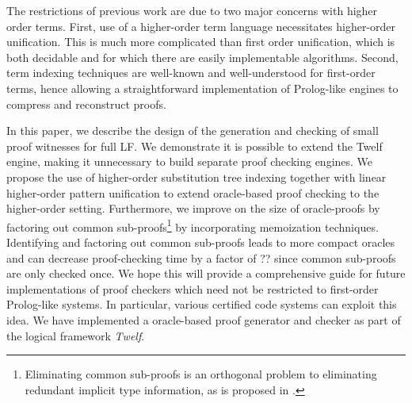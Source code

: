 \documentclass{acmconf}
\begin{document}
The restrictions of previous work are due to two major concerns with
higher order terms. First, use of a higher-order term language
necessitates higher-order unification. This is much more complicated
than first order unification, which is both decidable and for which
there are easily implementable algorithms. Second, term indexing
techniques are well-known and well-understood for first-order terms,
hence allowing a straightforward implementation of Prolog-like engines
to compress and reconstruct proofs.

In this paper, we describe the design of the generation and checking
of small proof witnesses for full LF. We demonstrate it is possible to
extend the Twelf engine, making it unnecessary to build separate proof
checking engines.  We propose the use of higher-order substitution
tree indexing together with linear higher-order pattern unification to
extend oracle-based proof checking to the higher-order
setting. Furthermore, we improve on the size of oracle-proofs by
factoring out common sub-proofs\footnote{Eliminating common sub-proofs
is an orthogonal problem to eliminating redundant implicit type
information, as is proposed in \cite{Necula98lics}.} by incorporating
memoization techniques. Identifying and factoring out common
sub-proofs leads to more compact oracles and can decrease
proof-checking time by a factor of ?? since common sub-proofs are only
checked once.  We hope this will provide a comprehensive guide for
future implementations of proof checkers which need not be restricted
to first-order Prolog-like systems. In particular, various certified
code systems can exploit this idea. We have implemented a oracle-based
proof generator and checker as part of the logical framework {\em
Twelf}.



\end{document}
